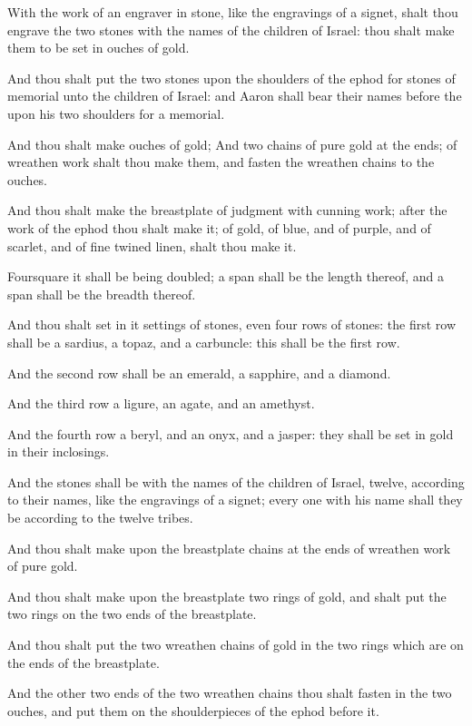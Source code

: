 \verse With the work of an engraver in stone, like the engravings of a signet, shalt thou engrave the two stones with the names of the children of Israel: thou shalt make them to be set in ouches of gold.

\verse And thou shalt put the two stones upon the shoulders of the ephod for stones of memorial unto the children of Israel: and Aaron shall bear their names before the \LORD upon his two shoulders for a memorial.

\verse And thou shalt make ouches of gold; \verse And two chains of pure gold at the ends; of wreathen work shalt thou make them, and fasten the wreathen chains to the ouches.

\verse And thou shalt make the breastplate of judgment with cunning work; after the work of the ephod thou shalt make it; of gold, of blue, and of purple, and of scarlet, and of fine twined linen, shalt thou make it.

\verse Foursquare it shall be being doubled; a span shall be the length thereof, and a span shall be the breadth thereof.

\verse And thou shalt set in it settings of stones, even four rows of stones: the first row shall be a sardius, a topaz, and a carbuncle: this shall be the first row.

\verse And the second row shall be an emerald, a sapphire, and a diamond.

\verse And the third row a ligure, an agate, and an amethyst.

\verse And the fourth row a beryl, and an onyx, and a jasper: they shall be set in gold in their inclosings.

\verse And the stones shall be with the names of the children of Israel, twelve, according to their names, like the engravings of a signet; every one with his name shall they be according to the twelve tribes.

\verse And thou shalt make upon the breastplate chains at the ends of wreathen work of pure gold.

\verse And thou shalt make upon the breastplate two rings of gold, and shalt put the two rings on the two ends of the breastplate.

\verse And thou shalt put the two wreathen chains of gold in the two rings which are on the ends of the breastplate.

\verse And the other two ends of the two wreathen chains thou shalt fasten in the two ouches, and put them on the shoulderpieces of the ephod before it.

